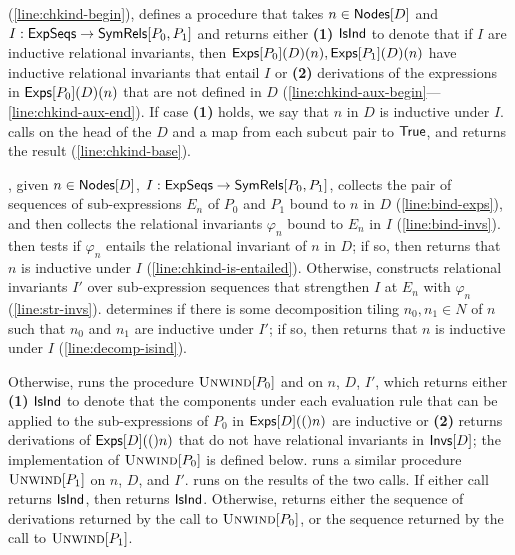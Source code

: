 (\autoref{line:chkind-begin}), defines a procedure \chkindaux that
takes $n \in \mathsf{Nodes}[ D ]$ and $I: \mathsf{ExpSeqs} \to \mathsf{SymRels}[ P_0, P_1 ]$
and returns either %
\textbf{(1)} $\mathsf{IsInd}$ to denote that if $I$ are inductive relational
invariants, then $\mathsf{Exps}[ P_0 ]( D )(n), \mathsf{Exps}[ P_1 ]( D )(n)$ have
inductive relational invariants that entail $I$ or
%
\textbf{(2)} derivations of the expressions in $\mathsf{Exps}[ P_0 ]( D )(n)$
that are not defined in $D$
(\autoref{line:chkind-aux-begin}---\autoref{line:chkind-aux-end}).
%
If case \textbf{(1)} holds, we say that $n$ in $D$ is inductive under
$I$.
%
\chkinductive calls \chkindaux on the head of the $D$ and a map from
each subcut pair to $\mathsf{True}$, and returns the result
(\autoref{line:chkind-base}).

\chkindaux, given $n \in \mathsf{Nodes}[ D ]$, $I : \mathsf{ExpSeqs} \to
\mathsf{SymRels}[ P_0, P_1 ]$, collects the pair of sequences of sub-expressions
$E_n$ of $P_0$ and $P_1$ bound to $n$ in $D$
(\autoref{line:bind-exps}), and then collects the relational
invariants $\varphi_n$ bound to $E_n$ in $I$
(\autoref{line:bind-invs}).
%
\chkindaux then tests if $\varphi_n$ entails the relational invariant
of $n$ in $D$;
% 
if so, then \chkindaux returns that $n$ is inductive under $I$
(\autoref{line:chkind-is-entailed}).
Otherwise, \chkindaux constructs relational invariants $I'$ over
sub-expression sequences that strengthen $I$ at $E_n$ with $\varphi_n$
(\autoref{line:str-invs}).
%
\chkindaux determines if there is some decomposition tiling $n_0, n_1
\in N$ of $n$ such that $n_0$ and $n_1$ are inductive under $I'$;
%
if so, then \chkindaux returns that $n$ is inductive under $I$
(\autoref{line:decomp-isind}).

Otherwise, \chkindaux runs the procedure $\textsc{Unwind}[ P_0 ]$ and on $n$,
$D$, $I'$, which returns either \textbf{(1)} $\mathsf{IsInd}$ to denote that
the components under each evaluation rule that can be applied to the
sub-expressions of $P_0$ in $\mathsf{Exps}[ D ]( ( )n)$ are inductive or %
\textbf{(2)} returns derivations of $\mathsf{Exps}[ D ]( ( )n)$ that do not have
relational invariants in $\mathsf{Invs}[ D ]$;
%
the implementation of $\textsc{Unwind}[ P_0 ]$ is defined below.
%
\chkindaux runs a similar procedure $\textsc{Unwind}[ P_1 ]$ on $n$, $D$, and
$I'$.
\chkindaux runs \chooseres on the results of the two calls.
%
If either call returns $\mathsf{IsInd}$, then \chooseres returns $\mathsf{IsInd}$.
%
Otherwise, \chooseres returns either the sequence of derivations
returned by the call to $\textsc{Unwind}[ P_0 ]$, or the sequence returned by
the call to $\textsc{Unwind}[ P_1 ]$.


